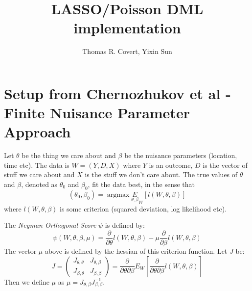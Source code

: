 \documentclass[11pt]{article}
\title{LASSO/Poisson DML implementation}
\author{Thomas R. Covert, Yixin Sun}
\DeclareMathOperator*{\argmax}{argmax}
\begin{document}
\maketitle

\tableofcontents

\section{Setup from Chernozhukov et al - Finite Nuisance Parameter Approach}
Let $\theta$ be the thing we care about and $\beta$ be the nuisance parameters (location, time etc).  The data is $W = (Y, D, X)$ where $Y$ is an outcome, $D$ is the vector of stuff we care about and $X$ is the stuff we don't care about.  The true values of $\theta$ and $\beta$, denoted as $\theta_0$ and $\beta_0$, fit the data best, in the sense that
\begin{equation*}
	(\theta_0, \beta_0) = \argmax \underset{\theta, \beta} E_W\left[l(W, \theta, \beta)\right]
\end{equation*}
where $l(W, \theta, \beta)$ is some criterion (squared deviation, log likelihood etc).

The \textit{Neyman Orthogonal Score} $\psi$ is defined by:
\begin{equation*}
	\psi(W, \theta, \beta, \mu) = \frac{\partial}{\partial \theta}l(W, \theta, \beta) - \mu \frac{\partial}{\partial \beta}l(W, \theta, \beta)
\end{equation*}
The vector $\mu$ above is defined by the hessian of this criterion function.  Let $J$ be:
\begin{equation*}
	J =
	\begin{pmatrix}
		J_{\theta, \theta} & J_{\theta, \beta} \\
		J_{\beta, \theta} & J_{\beta, \beta}
	\end{pmatrix}
	= \frac{\partial}{\partial \theta \partial \beta} E_W\left[\frac{\partial}{\partial \theta \partial \beta} l(W, \theta, \beta)\right]
\end{equation*}
Then we define $\mu$ as $\mu = J_{\theta, \beta} J_{\beta, \beta}^{-1}$.
\end{document}
